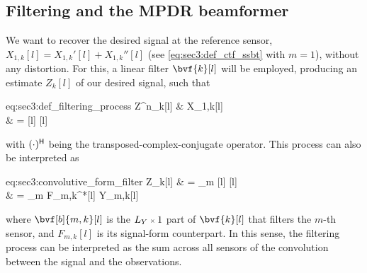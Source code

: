 
\subsection{Filtering and the MPDR beamformer}

We want to recover the desired signal at the reference sensor, $X_{1,k}[l] = X_{1,k}'[l] + X_{1,k}''[l]$ (see \cref{eq:sec3:def_ctf_ssbt} with $m=1$), without any distortion. For this, a linear filter $\bvf{k}[l]$ will be employed, producing an estimate $Z_{k}[l]$ of our desired signal, such that
\begin{equations}{eq:sec3:def_filtering_process}
	Z^n_{k}[l]
	& \approx X_{1,k}[l] \\
	& =  
\end{equations}
with $\he{(\cdot)}$ being the transposed-complex-conjugate operator. This process can also be interpreted as
\begin{equations}{eq:sec3:convolutive_form_filter}
	Z_{k}[l]
	& = \sum_{m}   \\
	& = \sum_{m} F_{m,k}^*[l] \ast Y_{m,k}[l]
\end{equations}
where $\bvf[b]{m,k}[l]$ is the $\sz{L_Y}{1}$ part of $\bvf{k}[l]$ that filters the $m$-th sensor, and $F_{m,k}[l]$ is its signal-form counterpart. In this sense, the filtering process can be interpreted as the sum across all sensors of the convolution between the signal and the observations.

